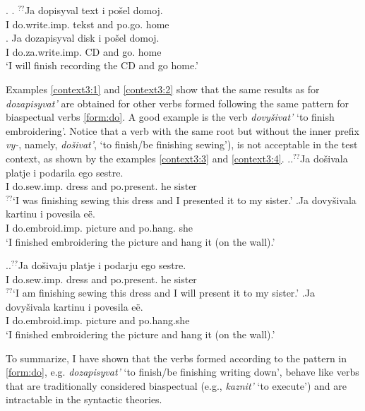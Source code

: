 \ex.\label{context2} \ag. \label{context1:2}$^{??}$Ja dopisyval text i po\v{s}el\textsuperscript{\PF} domoj.\\
{}I do.write.imp. tekst and po.go. home\\
\bg. \label{context2:2}Ja dozapisyval disk i po\v{s}el\textsuperscript{\PF} domoj.\\
I do.za.write.imp. CD and go. home\\
\trans `I will finish recording the CD and go home.'

Examples \ref{context3:1} and \ref{context3:2} show that the same results as for \textit{dozapisyvat'} are obtained for other verbs formed following the same pattern for biaspectual verbs \ref{form:do}. A good example is the verb \textit{dovy\v{s}ivat'} `to finish embroidering'. Notice that a verb with the same root but without the inner prefix \textit{vy-}, namely, \textit{do\v{s}ivat'}, `to finish/be finishing sewing'), is not acceptable in the test context, as shown by the examples \ref{context3:3} and \ref{context3:4}.
\ex.\label{context3}\ag.\label{context3:3}$^{??}$Ja do\v{s}ivala platje i podarila\textsuperscript{\PF} ego sestre.\\
{}I do.sew.imp. dress and po.present. he sister\\
$^{??}$`I was finishing sewing this dress and I presented it to my sister.'
\bg.\label{context3:1}Ja dovy\v{s}ivala kartinu i povesila\textsuperscript{\PF} e\"e.\\
I do.embroid.imp. picture and po.hang. she\\
\trans `I finished embroidering the picture and hang it (on the wall).'

\ex.\label{context31}\ag.\label{context3:4}$^{??}$Ja do\v{s}ivaju platje i podarju\textsuperscript{\PF} ego sestre.\\
{}I do.sew.imp. dress and po.present. he sister\\
$^{??}$`I am finishing sewing this dress and I will present it to my sister.'
\bg.\label{context3:2}Ja dovy\v{s}ivala kartinu i povesila\textsuperscript{\PF} e\"e.\\
I do.embroid.imp. picture and po.hang.she\\
\trans `I finished embroidering the picture and hang it (on the wall).'

To summarize, I have shown that the verbs formed according to the pattern in \ref{form:do}, e.g. \textit{dozapisyvat'} `to finish/be finishing writing down', behave like verbs that are traditionally considered biaspectual (e.g., \textit{kaznit'} `to execute') and are intractable in the syntactic theories.

